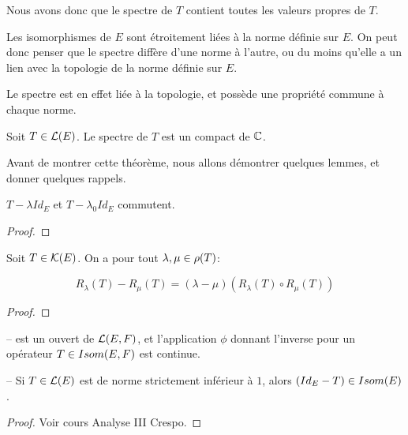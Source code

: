 Nous avons donc que le spectre de $T$ contient toutes les valeurs propres de
$T$.

Les isomorphismes de $E$ sont étroitement liées à la norme définie sur $E$. On
peut donc penser que le spectre diffère d'une norme à l'autre, ou du moins
qu'elle a un lien avec la topologie de la norme définie sur $E$.

Le spectre est en effet liée à la topologie, et possède une propriété commune à
chaque norme.

\begin{theorem}
	\label{thm:spectrum_compact}
	Soit $T \in \mathcal{L}(E)$.
	Le spectre de $T$ est un compact de $\mathbb{C}$.
\end{theorem}

Avant de montrer cette théorème, nous allons démontrer quelques lemmes, et
donner quelques rappels.

\begin{lemma}
	$T - \lambda Id_{E}$ et $T - \lambda_{0} Id_{E}$ commutent.
\end{lemma}

\begin{proof}

\end{proof}

\begin{proposition} 
	\label{prop:resolvante_identity}
	Soit $T \in \mathcal{K}(E)$.
	On a pour tout $\lambda, \mu \in \rho(T)$:

	\begin{equation}
		R_{\lambda}(T) - R_{\mu}(T) = (\lambda - \mu) (R_{\lambda}(T) \circ
		R_{\mu}(T))
	\end{equation}
\end{proposition}

\begin{proof}

\end{proof}

\begin{proposition}
	--  est un ouvert de $\mathcal{L}(E, F)$, et
	l'application $\phi$ donnant l'inverse pour un opérateur $T \in
	Isom(E, F)$ est continue.

	-- Si $T \in \mathcal{L}(E)$ est de norme strictement inférieur à $1$,
	alors $(Id_{E} - T) \in Isom(E)$.
\end{proposition}

\begin{proof}
	Voir cours Analyse III Crespo.
\end{proof}

